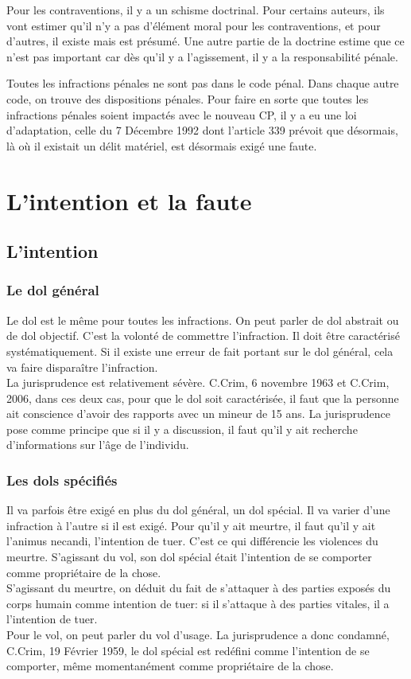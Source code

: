 \documentclass[10pt, a4paper, openany]{book}
\begin{document}
Pour les contraventions, il y a un schisme doctrinal. Pour certains auteurs, ils vont estimer qu'il n'y a pas d'élément moral pour les contraventions, et pour d'autres, il existe mais est présumé. Une autre partie de la doctrine estime que ce n'est pas important car dès qu'il y a l'agissement, il y a la responsabilité pénale.


Toutes les infractions pénales ne sont pas dans le code pénal. Dans chaque autre code, on trouve des dispositions pénales. Pour faire en sorte que toutes les infractions pénales soient impactés avec le nouveau CP, il y a eu une loi d'adaptation, celle du 7 Décembre 1992 dont l'article 339 prévoit que désormais, là où il existait un délit matériel, est désormais exigé une faute. 

\section{L'intention et la faute}

\subsection{L'intention}

\subsubsection{Le dol général}

Le dol est le même pour toutes les infractions. On peut parler de dol abstrait ou de dol objectif. C'est la volonté de commettre l'infraction. Il doit être caractérisé systématiquement. Si il existe une erreur de fait portant sur le dol général, cela va faire disparaître l'infraction. \\
La jurisprudence est relativement sévère. C.Crim, 6 novembre 1963 et C.Crim, 2006, dans ces deux cas, pour que le dol soit caractérisée, il faut que la personne ait conscience d'avoir des rapports avec un mineur de 15 ans. La jurisprudence pose comme principe que si il y a discussion, il faut qu'il y ait recherche d'informations sur l'âge de l'individu. 

\subsubsection{Les dols spécifiés}

Il va parfois être exigé en plus du dol général, un dol spécial. Il va varier d'une infraction à l'autre si il est exigé. Pour qu'il y ait meurtre, il faut qu'il y ait l'animus necandi, l'intention de tuer. C'est ce qui différencie les violences du meurtre. S'agissant du vol, son dol spécial était l'intention de se comporter comme propriétaire de la chose. \\
S'agissant du meurtre, on déduit du fait de s'attaquer à des parties exposés du corps humain comme intention de tuer: si il s'attaque à des parties vitales, il a l'intention de tuer. \\
Pour le vol, on peut parler du vol d'usage. La jurisprudence a donc condamné, C.Crim, 19 Février 1959, le dol spécial est redéfini comme l'intention de se comporter, même momentanément comme propriétaire de la chose. 
\end{document}

